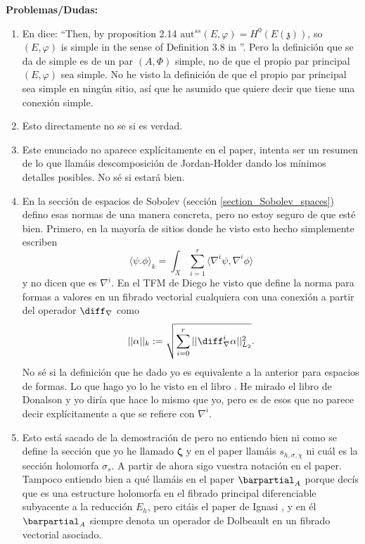 {\color{blue}
\textbf{Problemas/Dudas:}
\begin{enumerate}
    \item[\textbf{(1)}] En \parencite{garcia2009hitchin} dice: ``Then, by proposition 2.14 \(\mathrm{aut}^{ss}(E, \varphi)=H^0(E(\mathfrak{z}))\), so \((E, \varphi)\) is simple in the sense of Definition 3.8 in \parencite{bradlow2003relative}''. Pero la definición que se da de simple es de un par \((A, \Phi)\) simple, no de que el propio par principal \((E, \varphi)\) sea simple. No he visto la definición de que el propio par principal sea simple en ningún sitio, así que he asumido que quiere decir que tiene una conexión simple.
    \item[\textbf{(2)}] Esto directamente no se si es verdad. 
    \item[\textbf{(3)}] Este enunciado no aparece explícitamente en el paper, intenta ser un resumen de lo que llamáis descomposición de Jordan-Holder dando los mínimos detalles posibles. No sé si estará bien. 
    \item[\textbf{(4)}] En la sección de espacios de Sobolev (sección \ref{section_Sobolev_spaces}) defino esas normas de una manera concreta, pero no estoy seguro de que esté bien. Primero, en la mayoría de sitios donde he visto esto hecho simplemente escriben 
    \[
    \langle \psi. \phi\rangle_k=\int_X \sum_{i=1}^r \langle \nabla ^i \psi, \nabla^i \phi \rangle
    \]
    y no dicen que es \(\nabla^i\). En el TFM de Diego he visto que define la norma para formas a valores en un fibrado vectorial cualquiera con una conexión a partir del operador \(\diff_\nabla\) como
    \[
    ||\alpha||_k:=\sqrt{\sum_{i=0}^r ||\diff_\nabla ^i \alpha ||_{L_2}^2}.
    \]
    No sé si la definición que he dado yo es equivalente a la anterior para espacios de formas. Lo que hago yo lo he visto en el libro \parencite{wehrheim2004uhlenbeck}. He mirado el libro de Donalson \parencite{donaldson1990geometry} y yo diría que hace lo mismo que yo, pero es de esos que no parece decir explícitamente a que se refiere con \(\nabla^i\).
    \item[\textbf{(5)}] Esto está sacado de la demostración de \parencite{garcia2009hitchin} pero no entiendo bien ni como se define la sección que yo he llamado \(\bm{\zeta}\) y en el paper llamáis \(s_{h,\sigma, \chi}\) ni cuál es la sección holomorfa \(\sigma_{s}\). A partir de ahora sigo vuestra notación en el paper. Tampoco entiendo bien a qué llamáis en el paper \parencite{garcia2009hitchin} \(\barpartial_A\) porque decís que es una estructure holomorfa en el fibrado principal diferenciable subyacente a la reducción \(E_h\), pero citáis el paper de Ignasi \parencite{i1999hitchin}, y en él \(\barpartial_A\) siempre denota un operador de Dolbeault en un fibrado vectorial asociado.

\end{enumerate}}
